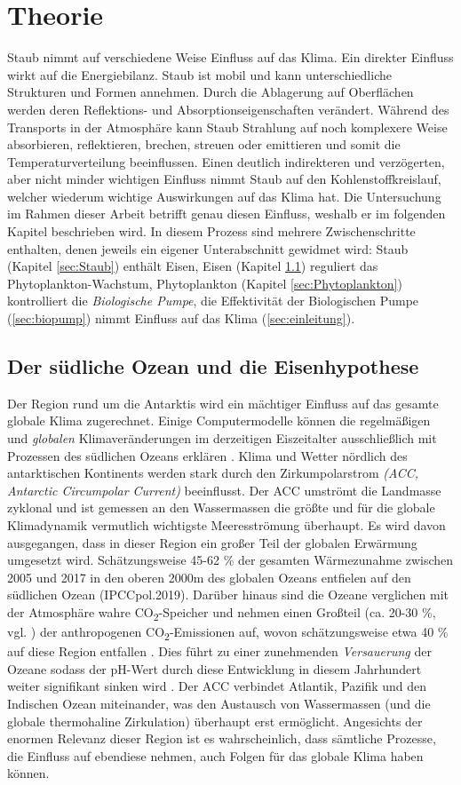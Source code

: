 \documentclass[12pt,a4paper,onecolumn]{scrartcl}
\newcommand{\cotwo}{CO\textsubscript{2}}
\begin{document}
\section{Theorie} \label{sec:Theorie}
Staub nimmt auf verschiedene Weise Einfluss auf das Klima. Ein direkter Einfluss wirkt auf die Energiebilanz. Staub ist mobil und kann unterschiedliche Strukturen und Formen annehmen. Durch die Ablagerung auf Oberflächen werden deren Reflektions- und Absorptionseigenschaften verändert. Während des Transports in der Atmosphäre kann Staub Strahlung auf noch komplexere Weise absorbieren, reflektieren, brechen, streuen oder emittieren \citep{Shao.2011} und somit die Temperaturverteilung beeinflussen. Einen deutlich indirekteren und verzögerten, aber nicht minder wichtigen Einfluss nimmt Staub auf den Kohlenstoffkreislauf, welcher wiederum wichtige Auswirkungen auf das Klima hat. Die Untersuchung im Rahmen dieser Arbeit betrifft genau diesen Einfluss, weshalb er im folgenden Kapitel beschrieben wird. In diesem Prozess sind mehrere Zwischenschritte enthalten, denen jeweils ein eigener Unterabschnitt gewidmet wird: Staub (Kapitel \ref{sec:Staub}) enthält Eisen, Eisen (Kapitel \ref{sec:Eisenhypothese}) reguliert das Phytoplankton-Wachstum, Phytoplankton (Kapitel \ref{sec:Phytoplankton}) kontrolliert die \textit{Biologische Pumpe}, die Effektivität der Biologischen Pumpe (\ref{sec:biopump}) nimmt Einfluss auf das Klima (\ref{sec:einleitung}).
\subsection{Der südliche Ozean und die Eisenhypothese} \label{sec:Eisenhypothese}
Der Region rund um die Antarktis wird ein mächtiger Einfluss auf das gesamte globale Klima zugerechnet. Einige Computermodelle können die regelmäßigen und \textit{globalen} Klimaveränderungen im derzeitigen Eiszeitalter ausschließlich mit Prozessen des südlichen Ozeans erklären \citep{Fischer.2010}. Klima und Wetter nördlich des antarktischen Kontinents werden stark durch den Zirkumpolarstrom \textit{(ACC, Antarctic Circumpolar Current)} beeinflusst. Der ACC umströmt die Landmasse zyklonal und ist gemessen an den Wassermassen die größte und für die globale Klimadynamik vermutlich wichtigste Meeresströmung überhaupt. Es wird davon ausgegangen, dass in dieser Region ein großer Teil der globalen Erwärmung umgesetzt wird. Schätzungsweise 45-62 \% der gesamten Wärmezunahme zwischen 2005 und 2017 in den oberen 2000m des globalen Ozeans entfielen auf den südlichen Ozean (IPCCpol.2019). Darüber hinaus sind die Ozeane verglichen mit der Atmosphäre wahre \cotwo -Speicher und nehmen einen Großteil (ca. 20-30 \%, vgl. \citep{IPCCpol.2019}) der anthropogenen \cotwo -Emissionen auf, wovon schätzungsweise etwa 40 \% auf diese Region entfallen \citep{Boning.2008}. Dies führt zu einer zunehmenden \textit{Versauerung} der Ozeane sodass der pH-Wert durch diese Entwicklung in diesem Jahrhundert weiter signifikant sinken wird \citep{IPCCpol.2019}. Der ACC verbindet Atlantik, Pazifik und den Indischen Ozean miteinander, was den Austausch von Wassermassen (und die globale thermohaline Zirkulation) überhaupt erst ermöglicht. Angesichts der enormen Relevanz dieser Region ist es wahrscheinlich, dass sämtliche Prozesse, die Einfluss auf ebendiese nehmen, auch Folgen für das globale Klima haben können.
\end{document}
